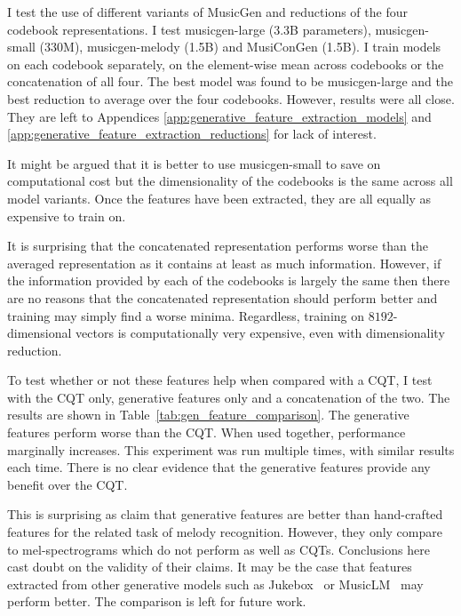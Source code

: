 I test the use of different variants of MusicGen and reductions of the four codebook representations. I test musicgen-large (3.3B parameters), musicgen-small (330M), musicgen-melody (1.5B) and MusiConGen (1.5B). I train models on each codebook separately, on the element-wise mean across codebooks or the concatenation of all four. The best model was found to be musicgen-large and the best reduction to average over the four codebooks. However, results were all close. They are left to Appendices \ref{app:generative_feature_extraction_models} and \ref{app:generative_feature_extraction_reductions} for lack of interest.

It might be argued that it is better to use musicgen-small to save on computational cost but the dimensionality of the codebooks is the same across all model variants. Once the features have been extracted, they are all equally as expensive to train on.

It is surprising that the concatenated representation performs worse than the averaged representation as it contains at least as much information. However, if the information provided by each of the codebooks is largely the same then there are no reasons that the concatenated representation should perform better and training may simply find a worse minima. Regardless, training on $8192$-dimensional vectors is computationally very expensive, even with dimensionality reduction.

To test whether or not these features help when compared with a CQT, I test with the CQT only, generative features only and a concatenation of the two. The results are shown in Table~\ref{tab:gen_feature_comparison}. The generative features perform worse than the CQT. When used together, performance marginally increases. This experiment was run multiple times, with similar results each time. There is no clear evidence that the generative features provide any benefit over the CQT. 

This is surprising as \citet{MelodyTranscriptionViaGenerativePreTraining} claim that generative features are better than hand-crafted features for the related task of melody recognition. However, they only compare to mel-spectrograms which do not perform as well as CQTs. Conclusions here cast doubt on the validity of their claims. It may be the case that features extracted from other generative models such as Jukebox~\citep{Jukebox} or MusicLM~\citep{MusicLM} may perform better. The comparison is left for future work.


